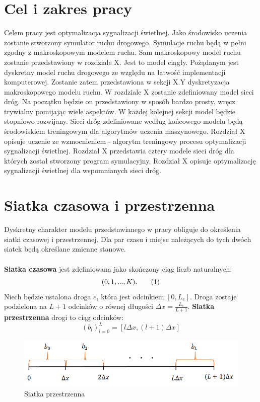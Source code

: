 \documentclass[12pt]{book}
\newcommand\addtag{\refstepcounter{equation}
\renewcommand{\labelenumii}{\theenumii}
\renewcommand{\theenumii}{\theenumi.\arabic{enumii}.}
\tag{\theequation}}
\begin{document}
\chapter{Cel i zakres pracy}
Celem pracy jest optymalizacja sygnalizacji świetlnej. Jako środowisko uczenia zostanie stworzony symulator ruchu drogowego. Symulacje ruchu będą w pełni zgodny z makroskopowym modelem ruchu. Sam makroskopowy model ruchu zostanie przedstawiony w rozdziale X. Jest to model ciągły. Pożądanym jest dyskretny model ruchu drogowego ze względu na łatwość implementacji komputerowej. Zostanie zatem przedstawiona w sekcji X.Y dyskretyzacja makroskopowego modelu ruchu. W rozdziale X zostanie zdefiniowany model sieci dróg. Na początku będzie on przedstawiony w sposób bardzo prosty, wręcz trywialny pomijając wiele aspektów. W każdej kolejnej sekcji model będzie stopniowo rozwijany. Sieci dróg zdefiniowane według końcowego modelu będą środowiskiem treningowym dla algorytmów uczenia maszynowego. Rozdział X opisuje uczenie ze wzmocnieniem - algorytm treningowy procesu optymalizacji sygnalizacji świetlnej. Rozdział X przedstawia cztery modele sieci dróg dla których został stworzony program symulacyjny. Rozdział X opisuje optymalizację sygnalizacji świetlnej dla wspomnianych sieci dróg.

   
\chapter{Siatka czasowa i przestrzenna}
Dyskretny charakter modelu przedstawianego w pracy obliguje do określenia siatki czasowej i przestrzennej. Dla par czasu i miejsc należących do tych dwóch siatek będą określane zmienne stanowe. \\ \\ \textbf{Siatka czasowa} jest zdefiniowana jako skończony ciąg liczb naturalnych:
\[(0,1,...,K). \addtag \]
Niech będzie ustalona droga $e$, która jest odcinkiem $[0,L_e]$. Droga zostaje podzielona na $L+1$ odcinków o równej długości $\Delta x=\frac{L_e}{L+1}$. \textbf{Siatka przestrzenna} drogi to ciąg odcinków:
\[(b_l)_{l=0}^{L}=[l\Delta x,(l+1)\Delta x]\]
\begin{figure}[H]
  \centering
    \includegraphics[width=14cm]{siatka_przestrzenna}
 \caption{Siatka przestrzenna}
 \label{fig:siatka_przestrzenna}
\end{figure}
\end{document}
